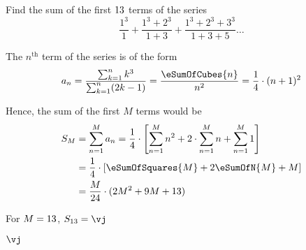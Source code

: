 



\SQUARE\va\vc
\MULTIPLY{}\vd
\MULTIPLY{}\ve
\ADD\vd\ve\vf
\ADD{}\vg
\DIVIDE{}\vh
\MULTIPLY\vh\va\vi
\ROUND[2]\vi\vj

\question[4] Find the sum of the first $13$ terms of the series 
\[\dfrac{1^3}{1} + \dfrac{1^3+2^3}{1+3} + \dfrac{1^3+2^3+3^3}{1+3+5}\ldots\]

\watchout

\ifprintanswers
\fi 

\begin{solution}[\halfpage]
	The $n^{\text{th}}$ term of the series is of the form 
  \[ a_n = \dfrac{\sum_{k=1}^{n}k^3}{\sum_{k=1}^{n}(2k-1)}
	= \dfrac{\eSumOfCubes{n}}{n^2} = \dfrac{1}{4}\cdot(n+1)^2 \]
	
	Hence, the sum of the first $M$ terms would be  
	\begin{align}
		S_M &= \sum_{n=1}^{M}a_n = \dfrac{1}{4}\cdot\left[ \sum_{n=1}^{M}n^2 + 2\cdot\sum_{n=1}^{M}n + \sum_{n=1}^{M}1 \right] \\
		&= \dfrac{1}{4}\cdot\left[ \eSumOfSquares{M} + 2\eSumOfN{M} + M \right] \\ 
		&= \dfrac{M}{24}\cdot(2M^2 + 9M + 13)
	\end{align}

	For $M=13$, $S_{\va} = \vj$
\end{solution}

\ifprintanswers
  \begin{codex}
    $\vj$
  \end{codex}
\fi
